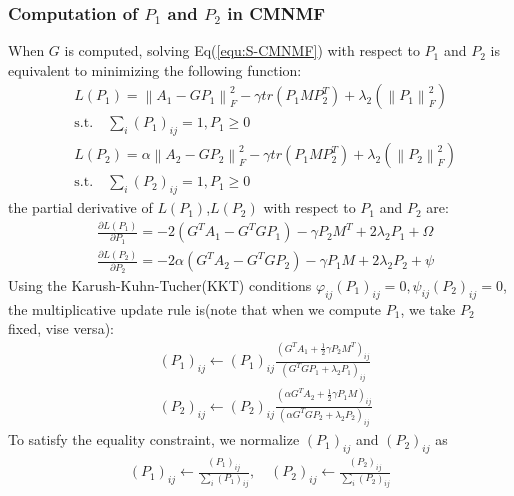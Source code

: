 \documentclass{bmcart}
\begin{document}
\subsubsection*{\textbf{Computation of $P_1$ and $P_2$ in CMNMF}}
When $G$ is computed, solving Eq(\ref{equ:S-CMNMF}) with respect to $P_1$  and $P_2$ is equivalent to minimizing the following function:
\begin{equation}\label{equ:obj_P1}\nonumber
\begin{split}
&L(P_{1})=\left\| {{A_1} - GP_1} \right\|_F^2 - \gamma tr({P_1}MP_2^T)+{\lambda _2}(\left\| {{P_1}} \right\|_F^2 )\\
   &\mathrm{s.t. }\quad \sum_i (P_1)_{ij}=1,P_1\ge 0\\
&L(P_{2})=\alpha\left\|A_2 - GP_2\right\|_F^2 - \gamma tr(P_1MP_2^T)+{\lambda _2}(\left\|P_2\right\|_F^2 )\\
   &\mathrm{s.t. }\quad \sum_i (P_2)_{ij}=1,P_1\ge 0
\end{split}
\end{equation}
the partial derivative of $L(P_1)$,$L(P_2)$ with respect to $P_1$ and $P_2$ are:
\begin{equation}\label{equ:P1_gradient}\nonumber
\begin{split}
&\frac{\partial{L(P_1)}}{\partial{P_1}}=
-2(G^TA_1-{G^TGP_1})-\gamma P_2M^T +2\lambda_2P_1+\Omega\\
&\frac{\partial{L(P_2)}}{\partial{P_2}}=
-2\alpha(G^TA_2-{G^TGP_2})-\gamma P_1M +2\lambda_2P_2+\psi
\end{split}
\end{equation}
Using the Karush-Kuhn-Tucher(KKT) conditions
 $\varphi_{ij}(P_1)_{ij}=0 , \psi_{ij}(P_2)_{ij}=0$, the multiplicative update rule is(note that when we compute $P_1$, we take $P_2$ fixed, vise versa):
\begin{equation}\label{updating_P}\nonumber
\begin{split}
&(P_1)_{ij}\leftarrow (P_1)_{ij}
\frac{(G^TA_1+\frac{1}{2}\gamma P_2M^T)_{ij}}
{(G^TGP_1+\lambda_2P_1)_{ij}}\\
&(P_2)_{ij}\leftarrow (P_2)_{ij}
\frac{(\alpha G^TA_2+\frac{1}{2}\gamma P_1M)_{ij}}
{(\alpha G^TGP_2 + \lambda_2P_2)_{ij}}
\end{split}
\end{equation}
To satisfy the equality constraint, we normalize $(P_1)_{ij}$ and $(P_2)_{ij}$ as
\begin{equation}\label{equ:updating_P2}\nonumber
\begin{split}
(P_1)_{ij}\leftarrow \frac{(P_1)_{ij}}{\sum_{i}(P_1)_{ij}}, \quad
(P_2)_{ij}\leftarrow \frac{(P_2)_{ij}}{\sum_{i}(P_2)_{ij}}
\end{split}
\end{equation}
\end{document}
